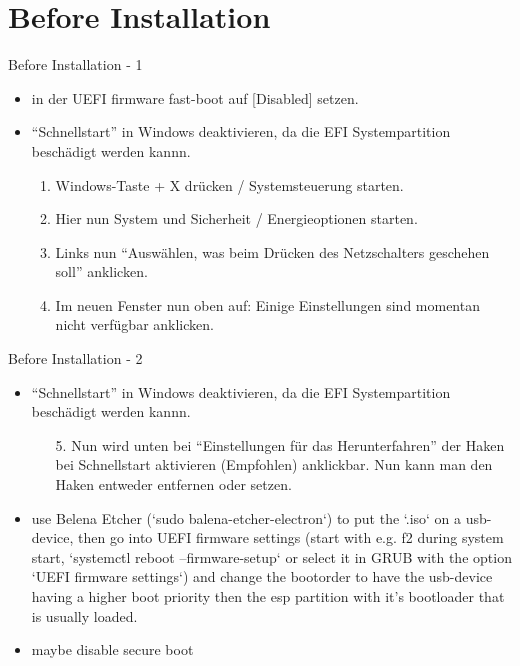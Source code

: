 
\section{Before Installation}

\begin{frame}{Before Installation - 1}
  \begin{itemize}
    \item in der UEFI firmware fast-boot auf [Disabled] setzen.
    \item \enquote{Schnellstart} in Windows deaktivieren, da die EFI Systempartition beschädigt werden kannn.
      \begin{enumerate}
        \item Windows-Taste + X drücken / Systemsteuerung starten.
        \item Hier nun System und Sicherheit / Energieoptionen starten.
        \item  Links nun \enquote{Auswählen, was beim Drücken des Netzschalters geschehen soll} anklicken.
        \item  Im neuen Fenster nun oben auf: Einige Einstellungen sind momentan nicht verfügbar anklicken.
      \end{enumerate}
  \end{itemize}
\end{frame}

\begin{frame}{Before Installation - 2}
  \begin{itemize}
    \item \enquote{Schnellstart} in Windows deaktivieren, da die EFI Systempartition beschädigt werden kannn.
      \begin{enumerate}
        \item[5.] Nun wird unten bei \enquote{Einstellungen für das Herunterfahren} der Haken bei Schnellstart aktivieren (Empfohlen) anklickbar. Nun kann man den Haken entweder entfernen oder setzen.
      \end{enumerate}
    \item use Belena Etcher (`sudo balena-etcher-electron`) to put the `.iso` on a usb-device, then go into UEFI firmware settings (start with e.g. f2 during system start, `systemctl reboot --firmware-setup` or select it in GRUB with the option `UEFI firmware settings`) and change the bootorder to have the usb-device having a higher boot priority then the esp partition with it's bootloader that is usually loaded.
    \item maybe disable secure boot
  \end{itemize}
\end{frame}
